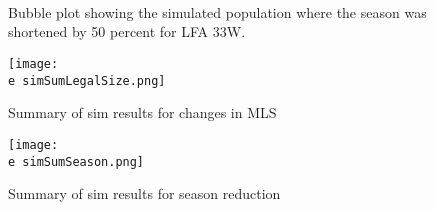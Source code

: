 \documentclass[11pt]{article}
\newcommand{\e}{\string~/bio.data/bio.lobster/figures/LFA2733Framework2018/} %
\begin{document}
    \begin{figure}
    \centering
                \\
                \\
                \\
        
         \caption{Bubble plot showing the simulated population where the season was shortened by 50 percent  for LFA 33W.}
    \end{figure}
    

    \begin{figure}
    \centering
        \texttt{[image: \\e simSumLegalSize.png]}
        \caption{Summary of sim results for changes in MLS}

    \end{figure}

    \begin{figure}
    \centering
        \texttt{[image: \\e simSumSeason.png]}
        \caption{Summary of sim results for season reduction}   

    \end{figure}    


  
\end{document}
